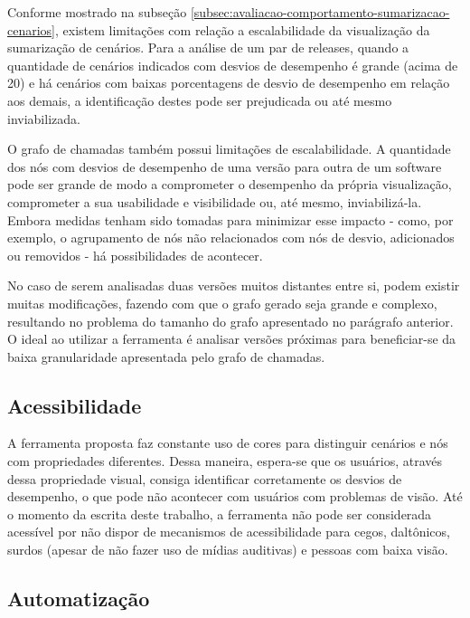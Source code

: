 Conforme mostrado na subseção \ref{subsec:avaliacao-comportamento-sumarizacao-cenarios}, existem limitações com relação a escalabilidade da visualização da sumarização de cenários. Para a análise de um par de releases, quando a quantidade de cenários indicados com desvios de desempenho é grande (acima de 20) e há cenários com baixas porcentagens de desvio de desempenho em relação aos demais, a identificação destes pode ser prejudicada ou até mesmo inviabilizada.

O grafo de chamadas também possui limitações de escalabilidade. A quantidade dos nós com desvios de desempenho de uma versão para outra de um software pode ser grande de modo a comprometer o desempenho da própria visualização, comprometer a sua usabilidade e visibilidade ou, até mesmo, inviabilizá-la. Embora medidas tenham sido tomadas para minimizar esse impacto - como, por exemplo, o agrupamento de nós não relacionados com nós de desvio, adicionados ou removidos - há possibilidades de acontecer.

No caso de serem analisadas duas versões muitos distantes entre si, podem existir muitas modificações, fazendo com que o grafo gerado seja grande e complexo, resultando no problema do tamanho do grafo apresentado no parágrafo anterior. O ideal ao utilizar a ferramenta é analisar versões próximas para beneficiar-se da baixa granularidade apresentada pelo grafo de chamadas.

\subsection{Acessibilidade} \label{subsec:consideracoes-limitacoes-acesibilidade}

A ferramenta proposta faz constante uso de cores para distinguir cenários e nós com propriedades diferentes. Dessa maneira, espera-se que os usuários, através dessa propriedade visual, consiga identificar corretamente os desvios de desempenho, o que pode não acontecer com usuários com problemas de visão. Até o momento da escrita deste trabalho, a ferramenta não pode ser considerada acessível por não dispor de mecanismos de acessibilidade para cegos, daltônicos, surdos (apesar de não fazer uso de mídias auditivas) e pessoas com baixa visão.

\subsection{Automatização} \label{subsec:consideracoes-limitacoes-automatizacao}

